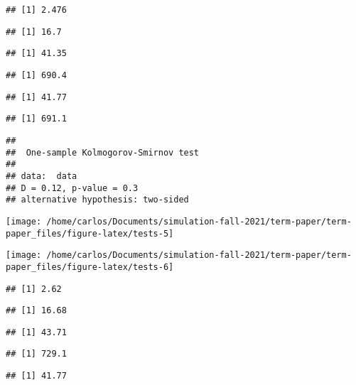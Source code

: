 \documentclass[9pt,twocolumn,twoside,]{pnas-new}
\begin{document}
\begin{verbatim}
## [1] 2.476
\end{verbatim}

\begin{verbatim}
## [1] 16.7
\end{verbatim}

\begin{verbatim}
## [1] 41.35
\end{verbatim}

\begin{verbatim}
## [1] 690.4
\end{verbatim}

\begin{verbatim}
## [1] 41.77
\end{verbatim}

\begin{verbatim}
## [1] 691.1
\end{verbatim}

\begin{verbatim}
## 
##  One-sample Kolmogorov-Smirnov test
## 
## data:  data
## D = 0.12, p-value = 0.3
## alternative hypothesis: two-sided
\end{verbatim}

\begin{flushleft}\texttt{[image: /home/carlos/Documents/simulation-fall-2021/term-paper/term-paper\_files/figure-latex/tests-5]} \end{flushleft}

\begin{flushleft}\texttt{[image: /home/carlos/Documents/simulation-fall-2021/term-paper/term-paper\_files/figure-latex/tests-6]} \end{flushleft}

\begin{verbatim}
## [1] 2.62
\end{verbatim}

\begin{verbatim}
## [1] 16.68
\end{verbatim}

\begin{verbatim}
## [1] 43.71
\end{verbatim}

\begin{verbatim}
## [1] 729.1
\end{verbatim}

\begin{verbatim}
## [1] 41.77
\end{verbatim}
\end{document}
